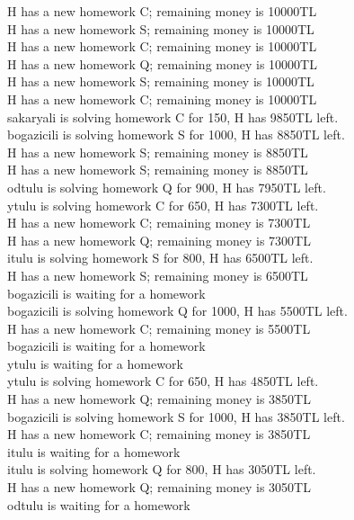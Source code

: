 \documentclass{article}
\begin{document}
H has a new homework C; remaining money is 10000TL\\
H has a new homework S; remaining money is 10000TL\\
H has a new homework C; remaining money is 10000TL\\
H has a new homework Q; remaining money is 10000TL\\
H has a new homework S; remaining money is 10000TL\\
H has a new homework C; remaining money is 10000TL\\
sakaryali is solving homework C for 150, H has 9850TL left.\\
bogazicili is solving homework S for 1000, H has 8850TL left.\\
H has a new homework S; remaining money is 8850TL\\
H has a new homework S; remaining money is 8850TL\\
odtulu is solving homework Q for 900, H has 7950TL left.\\
ytulu is solving homework C for 650, H has 7300TL left.\\
H has a new homework C; remaining money is 7300TL\\
H has a new homework Q; remaining money is 7300TL\\
itulu is solving homework S for 800, H has 6500TL left.\\
H has a new homework S; remaining money is 6500TL\\
bogazicili is waiting for a homework\\
bogazicili is solving homework Q for 1000, H has 5500TL left.\\
H has a new homework C; remaining money is 5500TL\\
bogazicili is waiting for a homework\\
ytulu is waiting for a homework\\
ytulu is solving homework C for 650, H has 4850TL left.\\
H has a new homework Q; remaining money is 3850TL\\
bogazicili is solving homework S for 1000, H has 3850TL left.\\
H has a new homework C; remaining money is 3850TL\\
itulu is waiting for a homework\\
itulu is solving homework Q for 800, H has 3050TL left.\\
H has a new homework Q; remaining money is 3050TL\\
odtulu is waiting for a homework\\
\end{document}

